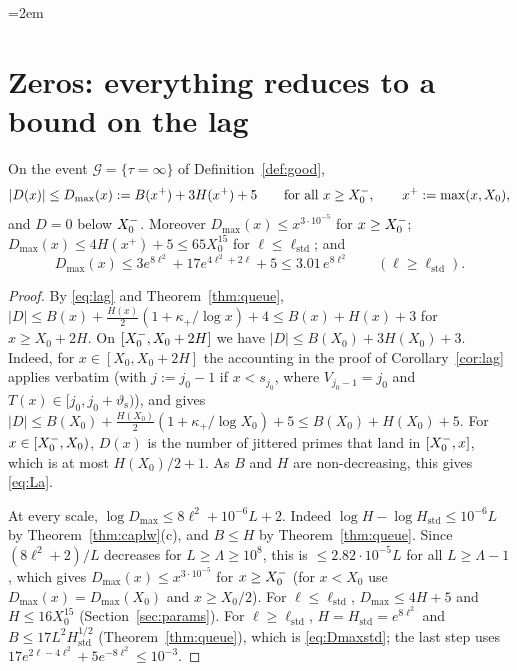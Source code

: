 \begingroup\emergencystretch=2em %
\section{Zeros: everything reduces to a bound on the lag}\label{sec:zeros}

\begin{proposition}\label{prop:La}
On the event $\mathcal G=\{\tau=\infty\}$ of Definition~\ref{def:good},
\begin{equation}\label{eq:La}
  |D(x)|\le D_{\max}(x):=B(x^+)+3H(x^+)+5\qquad\text{for all }x\ge X_0^{-},\qquad x^+:=\max(x,X_0),
\end{equation}
and $D=0$ below $X_0^{-}$. Moreover $D_{\max}(x)\le x^{3\cdot10^{-5}}$ for $x\ge X_0^{-}$; $D_{\max}(x)\le4H(x^+)+5\le65X_0^{15}$ for
$\ell\le\ell_{\mathrm{std}}$; and
\begin{equation}\label{eq:Dmaxstd}
  D_{\max}(x)\le3e^{8\ell^2}+17e^{4\ell^2+2\ell}+5\le3.01\,e^{8\ell^2}\qquad(\ell\ge\ell_{\mathrm{std}}).
\end{equation}
\end{proposition}
\begin{proof}
By \eqref{eq:lag} and Theorem~\ref{thm:queue}, $|D|\le B(x)+\frac{H(x)}2(1+\kappa_+/\log x)+4\le B(x)+H(x)+3$ for $x\ge X_0+2H$.
On $[X_0^{-},X_0+2H]$ we have $|D|\le B(X_0)+3H(X_0)+3$. Indeed, for $x\in[X_0,X_0+2H]$ the accounting in the proof of
Corollary~\ref{cor:lag} applies verbatim (with $j:=j_0-1$ if $x<s_{j_0}$, where $V_{j_0-1}=j_0$ and
$T(x)\in[j_0,j_0+\vartheta_{\mathrm s})$), and gives $|D|\le B(X_0)+\frac{H(X_0)}2(1+\kappa_+/\log X_0)+5\le B(X_0)+H(X_0)+5$. For
$x\in[X_0^{-},X_0)$, $D(x)$ is the number of jittered primes that land in $[X_0^{-},x]$, which is at most $H(X_0)/2+1$. As $B$ and $H$ are
non-decreasing, this gives \eqref{eq:La}.

At every scale, $\log D_{\max}\le8\ell^2+10^{-6}L+2$. Indeed $\log H-\log H_{\mathrm{std}}\le10^{-6}L$ by
Theorem~\ref{thm:caplw}(c), and $B\le H$ by Theorem~\ref{thm:queue}. Since $(8\ell^2+2)/L$ decreases for $L\ge\Lambda\ge10^8$, this
is $\le2.82\cdot10^{-5}L$ for all $L\ge\Lambda-1$, which gives $D_{\max}(x)\le x^{3\cdot10^{-5}}$ for $x\ge X_0^{-}$ (for $x<X_0$ use
$D_{\max}(x)=D_{\max}(X_0)$ and $x\ge X_0/2$). For $\ell\le\ell_{\mathrm{std}}$, $D_{\max}\le4H+5$ and $H\le16X_0^{15}$
(Section~\ref{sec:params}). For $\ell\ge\ell_{\mathrm{std}}$, $H=H_{\mathrm{std}}=e^{8\ell^2}$ and $B\le17L^2H_{\mathrm{std}}^{1/2}$
(Theorem~\ref{thm:queue}), which is \eqref{eq:Dmaxstd}; the last step uses $17e^{2\ell-4\ell^2}+5e^{-8\ell^2}\le10^{-3}$.
\end{proof}

